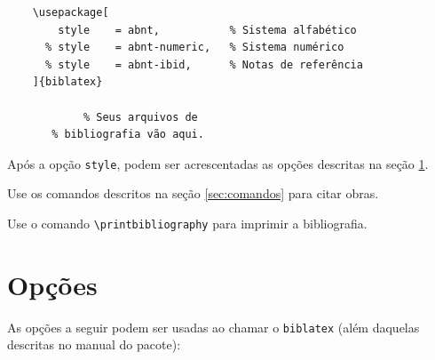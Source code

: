 \documentclass[a4paper]{article}
\begin{document}
\begin{verbatim}
    \usepackage[
        style    = abnt,           % Sistema alfabético
      % style    = abnt-numeric,   % Sistema numérico
      % style    = abnt-ibid,      % Notas de referência
    ]{biblatex}

            % Seus arquivos de
       % bibliografia vão aqui.
\end{verbatim}

Após a opção \texttt{style}, podem ser acrescentadas
as opções descritas na seção \ref{sec:opções}.

Use os comandos descritos na seção \ref{sec:comandos} para citar obras.

Use o comando \verb"\printbibliography" para imprimir a bibliografia.

\clearpage
\section{Opções}%
\label{sec:opções}

As opções a seguir podem ser usadas ao chamar o \texttt{biblatex} (além
daquelas descritas no manual do pacote):
\end{document}
